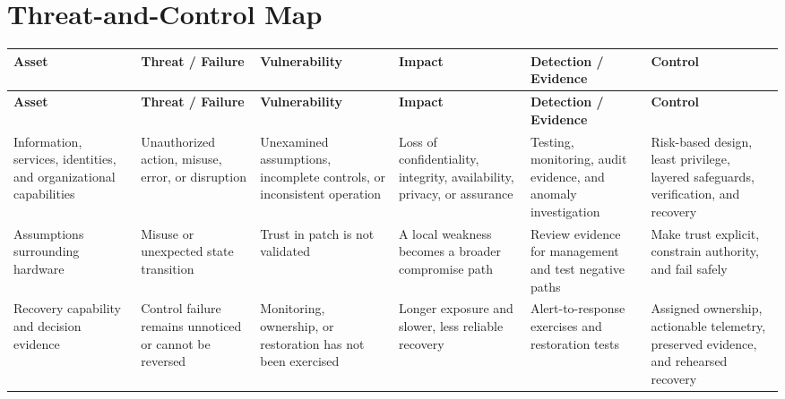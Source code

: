 \documentclass[11pt,letterpaper]{article}
\begin{document}
\section*{Threat-and-Control Map}
\begingroup\scriptsize\setlength{\tabcolsep}{2pt}
\begin{longtable}{>{\raggedright\arraybackslash}p{}>{\raggedright\arraybackslash}p{}>{\raggedright\arraybackslash}p{}>{\raggedright\arraybackslash}p{}>{\raggedright\arraybackslash}p{}>{\raggedright\arraybackslash}p{}}
\toprule\rowcolor{Navy}\color{white}\textbf{Asset} & \color{white}\textbf{Threat / Failure} & \color{white}\textbf{Vulnerability} & \color{white}\textbf{Impact} & \color{white}\textbf{Detection / Evidence} & \color{white}\textbf{Control}\\\midrule
\endfirsthead
\toprule\rowcolor{Navy}\color{white}\textbf{Asset} & \color{white}\textbf{Threat / Failure} & \color{white}\textbf{Vulnerability} & \color{white}\textbf{Impact} & \color{white}\textbf{Detection / Evidence} & \color{white}\textbf{Control}\\\midrule
\endhead
Information, services, identities, and organizational capabilities & Unauthorized action, misuse, error, or disruption & Unexamined assumptions, incomplete controls, or inconsistent operation & Loss of confidentiality, integrity, availability, privacy, or assurance & Testing, monitoring, audit evidence, and anomaly investigation & Risk-based design, least privilege, layered safeguards, verification, and recovery\\\midrule
Assumptions surrounding hardware & Misuse or unexpected state transition & Trust in patch is not validated & A local weakness becomes a broader compromise path & Review evidence for management and test negative paths & Make trust explicit, constrain authority, and fail safely\\\midrule
Recovery capability and decision evidence & Control failure remains unnoticed or cannot be reversed & Monitoring, ownership, or restoration has not been exercised & Longer exposure and slower, less reliable recovery & Alert-to-response exercises and restoration tests & Assigned ownership, actionable telemetry, preserved evidence, and rehearsed recovery\\\midrule
\bottomrule
\end{longtable}
\endgroup
\end{document}

